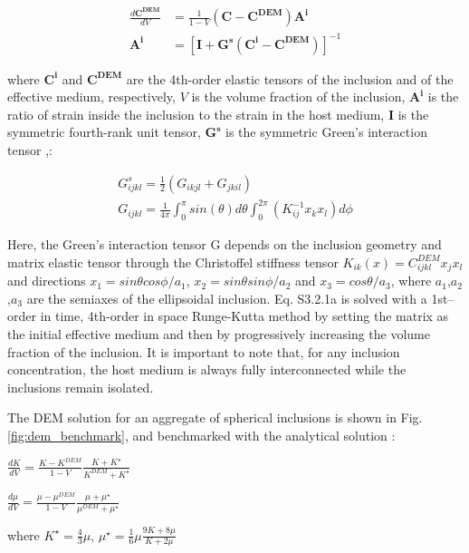\begin{align}
    \frac{d\mathbf{C^{DEM}}}{dV}&=\frac{1}{1-V}(\mathbf{C}-\mathbf{C^{DEM}})\mathbf{A^i}\\
    \mathbf{A^i}&=[\mathbf{I}+\mathbf{G^s}(\mathbf{C^i}-\mathbf{C^{DEM}} )]^{-1}
\end{align}

where $\mathbf{C^i}$ and $\mathbf{C^{DEM}}$ are the 4th-order elastic tensors of the inclusion and of the effective medium, respectively, $V$ is the volume fraction of the inclusion, $\mathbf{A^i}$ is the ratio of strain inside the inclusion to the strain in the host medium, $\mathbf{I}$ is the symmetric fourth-rank unit tensor, $\mathbf{G^s}$ is the symmetric Green’s interaction tensor \citep{mainprice1997tect},\citep{hornby1994}:

\begin{gather}
    G_{ijkl}^s=\frac{1}{2}(G_{ikjl}+G_{jkil})\\
    G_{ijkl}=\frac{1}{4\pi} \int_{0}^\pi sin(\theta) d\theta \int_{0}^{2\pi} (K_{ij}^{-1}x_k x_l) d\phi 
\end{gather}

Here, the Green’s interaction tensor G depends on the inclusion geometry and matrix elastic tensor through the Christoffel stiffness tensor $K_{ik} (x)=C_{ijkl}^{DEM} x_j x_l$ and directions $x_1=sin\theta cos\phi/a_1$, $x_2=sin\theta sin\phi/a_2$  and $x_3=cos\theta/a_3$, where $a_1$,$a_2$,$a_3$ are the semiaxes of the ellipsoidal inclusion.
Eq. S3.2.1a is solved with a 1st–order in time, 4th-order in space Runge-Kutta method by setting the matrix as the initial effective medium and then by progressively increasing the volume fraction of the inclusion. It is important to note that, for any inclusion concentration, the host medium is always fully interconnected while the inclusions remain isolated.

The DEM solution for an aggregate of spherical inclusions is shown in Fig. \ref{fig:dem_benchmark}, and benchmarked with the analytical solution \citep{mclaughlin1977}:

\begin{center}
$\frac{dK}{dV}=\frac{K-K^{DEM}}{1-V}\frac{K+K^\star}{K^{DEM}+K^\star}$

$\frac{d\mu}{dV}=\frac{\mu-\mu^{DEM}}{1-V}\frac{\mu+\mu^\star}{\mu^{DEM}+\mu^\star}$

where $K^\star=\frac{4}{3}\mu$, $\mu^\star=\frac{1}{6}\mu\frac{9K+8\mu}{K+2\mu}$
\end{center}

